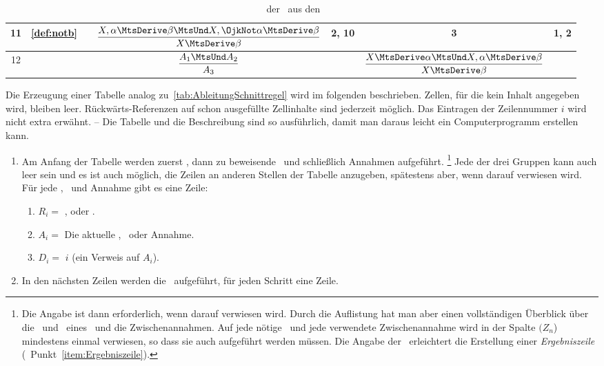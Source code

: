 {\begin{table}[!htb]
\begin{tabular}{|c||c|c|c|c|c|c|}
		\\\hline
		11 & \ref{def:notb} & & $\dfrac{X,\alpha \MtsDerive \beta \MtsUnd X,\OjkNot\alpha \MtsDerive \beta}{X \MtsDerive \beta}$ & 2, 10 & 3 & 1, 2
		\\\hline\hline
		12 & \centerParbox{1.4cm}{\ref{def:AR}, \ref{def:MR}, \ref{def:nota}, \ref{def:notb}} & & $\dfrac{A_1 \MtsUnd A_2}{A_3}$ & & $\dfrac{X \MtsDerive \alpha \MtsUnd X, \alpha \MtsDerive \beta}{X \MtsDerive \beta}$ &
		\\\hline
	\end{tabular}
	\caption{\Ableitung\ der \Schnittregel\ aus den \Basisregeln}
	\label{tab:AbleitungSchnittregel}
\end{table}

Die Erzeugung einer Tabelle analog zu~\vref{tab:AbleitungSchnittregel} wird im folgenden beschrieben.
Zellen, für die kein Inhalt angegeben wird, bleiben leer.
Rückwärts-Referenzen auf schon ausgefüllte Zellinhalte sind jederzeit möglich.
Das Eintragen der Zeilennummer $i$ wird nicht extra erwähnt.
-- Die Tabelle und die Beschreibung sind so ausführlich, damit man daraus leicht ein Computerprogramm erstellen kann.
%
\begin{enumerate}
	\item Am Anfang der Tabelle werden zuerst \Praemissen, dann zu beweisende \Konklusionen\ und schließlich Annahmen aufgeführt.%
	\footnote{%
		Die Angabe ist dann erforderlich, wenn darauf verwiesen wird.
		Durch die Auflistung hat man aber einen vollständigen Überblick über die \Praemissen\ und \Konklusionen\ eines \Beweises\ und die Zwischenannahmen.
		Auf jede nötige \Praemisse\ und jede verwendete Zwischenannahme wird in der Spalte $(Z_n$) mindestens einmal verwiesen, so dass sie auch aufgeführt werden müssen.
		Die Angabe der \Konklusionen\ erleichtert die Erstellung einer \emph{Ergebniszeile} (\seename\ Punkt~\ref{item:Ergebniszeile}).
	}
	Jede der drei Gruppen kann auch leer sein und es ist auch möglich, die Zeilen an anderen Stellen der Tabelle anzugeben, spätestens aber, wenn darauf verwiesen wird.
	Für jede \Praemisse, \Konklusion\ und Annahme gibt es eine Zeile:
	\begin{enumerate}
		\item $R_i =$ \strqt{\Praemisse}, \strqt{\Konklusion} oder .
		\item $A_i =$ Die aktuelle \Praemisse, \Konklusion\ oder Annahme.
		\item $D_i =$ $i$ \quad (ein Verweis auf $A_i$).
	\end{enumerate}
	\item In den nächsten Zeilen werden die \Beweisschritte\ aufgeführt, für jeden Schritt eine Zeile.


\end{enumerate}}
